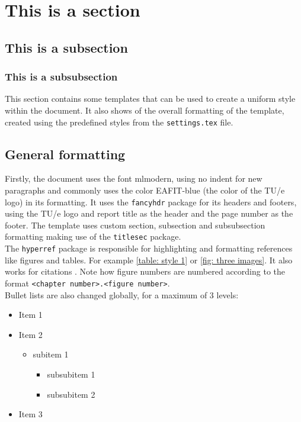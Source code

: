 \section{This is a section} 
\subsection{This is a subsection}

\subsubsection{This is a subsubsection}
This section contains some templates that can be used to create a uniform style within the document. It also shows of the overall formatting of the template, created using the predefined styles from the \texttt{settings.tex} file.

\subsection{General formatting}
Firstly, the document uses the font mlmodern, using no indent for new paragraphs and commonly uses the color \textcolor{EAFIT-blue}{EAFIT-blue} (the color of the TU/e logo) in its formatting. It uses the \texttt{fancyhdr} package for its headers and footers, using the TU/e logo and report title as the header and the page number as the footer. The template uses custom section, subsection and subsubsection formatting making use of the \texttt{titlesec} package.\\
The \texttt{hyperref} package is responsible for highlighting and formatting references like figures and tables. For example \cref{table: style 1} or \cref{fig: three images}. It also works for citations \cite{texbook}. Note how figure numbers are numbered according to the format \texttt{<chapter number>.<figure number>}.\\

Bullet lists are also changed globally, for a maximum of 3 levels:

\begin{itemize}
    \item Item 1
    \item Item 2
    \begin{itemize}
        \item subitem 1
        \begin{itemize}
            \item subsubitem 1
            \item subsubitem 2
        \end{itemize}
    \end{itemize}
    \item Item 3
\end{itemize}

